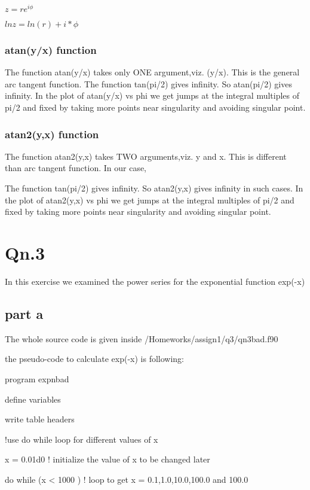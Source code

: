 \documentclass{article}
\begin{document}
$ z = r e^ {i \phi }$

$lnz = ln(r) + i * {\phi} $ 

\subsubsection{ atan(y/x) function}

The function atan(y/x) takes only ONE argument,viz. (y/x).
This is the general arc tangent function.
The function tan(pi/2) gives infinity. So atan(pi/2) gives infinity.
In the plot of atan(y/x) vs phi we get jumps at the 
integral multiples of pi/2 and fixed by taking more points near singularity and
avoiding singular point.


\subsubsection{ atan2(y,x) function}
The function atan2(y,x) takes TWO arguments,viz. y and x.
This is different than arc tangent function.
In our case,

The function tan(pi/2) gives infinity. So atan2(y,x) gives infinity in such cases.
In the plot of atan2(y,x) vs phi we get jumps at the 
integral multiples of pi/2 and fixed by taking more points near singularity and
avoiding singular point.

\section{Qn.3}
In this exercise we examined the power series for the exponential function exp(-x)

\subsection{part a}
The whole source code is given inside /Homeworks/assign1/q3/qn3bad.f90

the pseudo-code to calculate exp(-x) is following:

program expnbad

define variables

write table headers

!use do while loop for different values of x
    
    x = 0.01d0           ! initialize the value of x to be changed later
    
    do while (x < 1000 ) ! loop to get x = 0.1,1.0,10.0,100.0 and 100.0
                       
\end{document}
